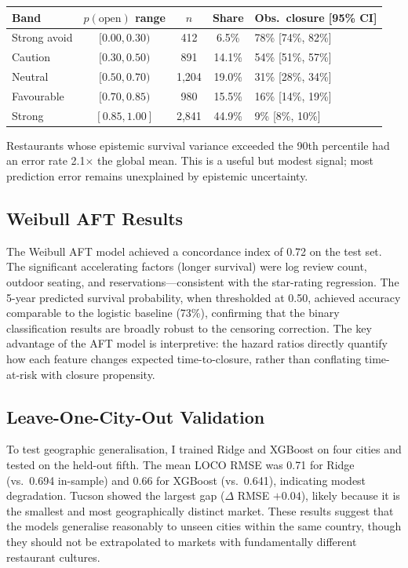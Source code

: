 \documentclass[10pt, letterpaper]{article}
\begin{document}
\begin{center}\small
\renewcommand{\arraystretch}{1.2}
\begin{tabular}{@{}lcccl@{}}
\toprule
Band & $p(\text{open})$ range & $n$ & Share & Obs.\ closure [95\% CI] \\
\midrule
Strong avoid & $[0.00, 0.30)$ & 412 & 6.5\% & 78\% [74\%, 82\%] \\
Caution      & $[0.30, 0.50)$ & 891 & 14.1\% & 54\% [51\%, 57\%] \\
Neutral      & $[0.50, 0.70)$ & 1,204 & 19.0\% & 31\% [28\%, 34\%] \\
Favourable   & $[0.70, 0.85)$ & 980 & 15.5\% & 16\% [14\%, 19\%] \\
Strong       & $[0.85, 1.00]$ & 2,841 & 44.9\% & 9\% [8\%, 10\%] \\
\bottomrule
\end{tabular}
\end{center}

Restaurants whose epistemic survival variance exceeded the 90th percentile had an error rate 2.1$\times$ the global mean. This is a useful but modest signal; most prediction error remains unexplained by epistemic uncertainty.

\subsection{Weibull AFT Results}

The Weibull AFT model achieved a concordance index of 0.72 on the test set. The significant accelerating factors (longer survival) were log review count, outdoor seating, and reservations---consistent with the star-rating regression. The 5-year predicted survival probability, when thresholded at 0.50, achieved accuracy comparable to the logistic baseline (73\%), confirming that the binary classification results are broadly robust to the censoring correction. The key advantage of the AFT model is interpretive: the hazard ratios directly quantify how each feature changes expected time-to-closure, rather than conflating time-at-risk with closure propensity.

\subsection{Leave-One-City-Out Validation}

To test geographic generalisation, I trained Ridge and XGBoost on four cities and tested on the held-out fifth. The mean LOCO RMSE was 0.71 for Ridge (vs.\ 0.694 in-sample) and 0.66 for XGBoost (vs.\ 0.641), indicating modest degradation. Tucson showed the largest gap ($\Delta$ RMSE $+0.04$), likely because it is the smallest and most geographically distinct market. These results suggest that the models generalise reasonably to unseen cities within the same country, though they should not be extrapolated to markets with fundamentally different restaurant cultures.
\end{document}
